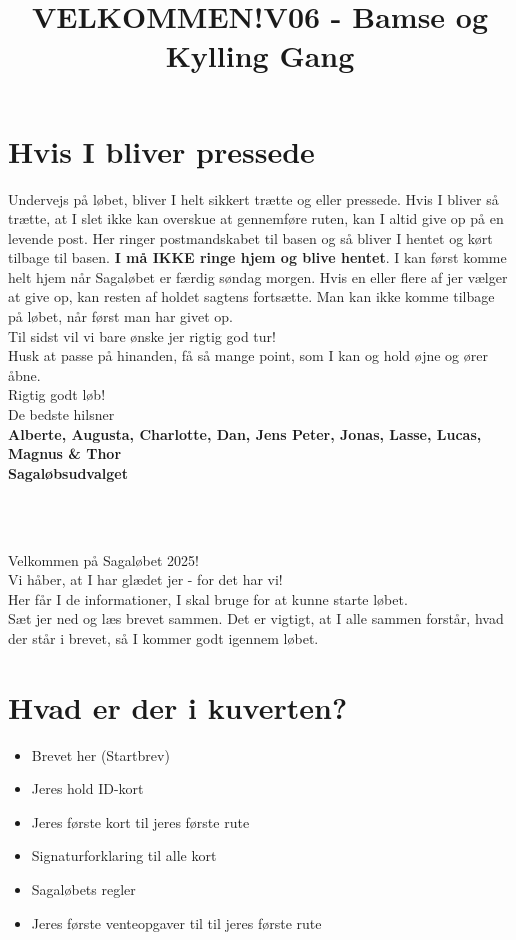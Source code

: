 \section{Hvis I bliver pressede}
Undervejs på løbet, bliver I helt sikkert trætte og eller pressede. Hvis I bliver så trætte, at I slet ikke kan overskue at gennemføre ruten, kan I altid give op på en levende post. Her ringer postmandskabet til basen og så bliver I hentet og kørt tilbage til basen. \textbf{I må IKKE ringe hjem og blive hentet}. I kan først komme helt hjem når Sagaløbet er færdig søndag morgen. Hvis en eller flere af jer vælger at give op, kan resten af holdet sagtens fortsætte. Man kan ikke komme tilbage på løbet, når først man har givet op.\\
\newline
Til sidst vil vi bare ønske jer rigtig god tur!\\
Husk at passe på hinanden, få så mange point, som I kan og hold øjne og ører åbne.\\
\newline
Rigtig godt løb!\\
\newline
\textcolor{søblå}{De bedste hilsner}\\
\textcolor{natblå}{\textbf{Alberte, Augusta, Charlotte, Dan, Jens Peter, Jonas, Lasse, Lucas, Magnus \& Thor}}\\
\textcolor{natblå}{\textbf{Sagaløbsudvalget}}\\
\newpage
\title{VELKOMMEN!}\\
\newline
\title{\textcolor{søblå}{V06 - Bamse og Kylling Gang }}\\
\newline
Velkommen på Sagaløbet 2025!\\
Vi håber, at I har glædet jer - for det har vi!\\
Her får I de informationer, I skal bruge for at kunne starte løbet.\\
Sæt jer ned og læs brevet sammen. Det er vigtigt, at I alle sammen forstår, hvad der står i brevet, så I kommer godt igennem løbet.
\section{Hvad er der i kuverten?}
\begin{itemize}
    \item Brevet her (Startbrev)
    \item Jeres hold ID-kort
    \item Jeres første kort til jeres første rute
    \item Signaturforklaring til alle kort
    \item Sagaløbets regler
    \item Jeres første venteopgaver til til jeres første rute
\end{itemize}
